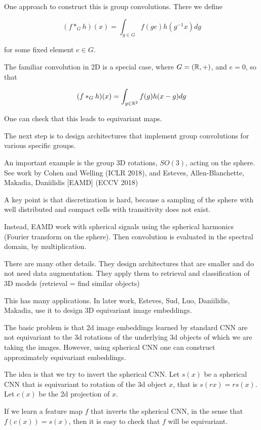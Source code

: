 \documentclass[english]{article}
\begin{document}
\item One approach to construct this is group convolutions. There we define

$$(f *_G h)(x) = \int_{g\in G} f(ge)h(g^{-1}x)dg$$

for some fixed element $e\in G$. 

The familiar convolution in 2D is a special case, where $G = (\mathbb{R},+)$, and $e = 0$, so that 

$$(f *_G h)(x) = \int_{g\in \mathbb{R}^2} f(g)h(x-g)dg$$

One can check that this leads to equivariant maps.

\item The next step is to design architectures that implement group convolutions for various specific groups. 

An important example is the group 3D rotations, $SO(3)$, acting on the sphere. See work by Cohen and Welling (ICLR 2018), and Esteves, Allen-Blanchette, Makadia, Daniilidis [EAMD] (ECCV 2018)

A key point is that discretization is hard, because a sampling of the sphere with well distributed and compact cells with transitivity does not exist. 

\item Instead, EAMD work with spherical signals using the spherical harmonics (Fourier transform on the sphere). Then convolution is evaluated in the spectral domain, by multiplication. 

There are many other details. They design architectures that are smaller and do not need data augmentation. They apply them to retrieval and classification of 3D models (retrieval = find similar objects)

\item This has many applications. In later work, Esteves, Sud, Luo, Daniilidis, Makadia, use it to design 3D equivariant image embeddings. 

The basic problem is that 2d image embeddings learned by standard CNN are not equivariant to the 3d rotations of the underlying 3d objects of which we are taking the images. However, using spherical CNN one can construct approximately equivariant embeddings. 

The idea is that we try to invert the spherical CNN. Let $s(x)$ be a spherical CNN that is equivariant to rotation of the 3d object $x$, that is $s(rx)=rs(x)$. Let $c(x)$ be the 2d projection of $x$. 

If we learn a feature map $f$ that inverts the spherical CNN, in the sense that $f(c(x))=s(x)$, then it is easy to check that $f$ will be equivariant. 
\end{document}
